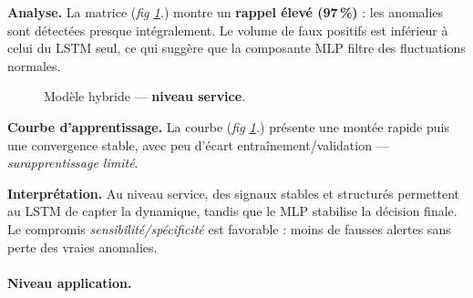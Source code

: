 \documentclass[conference]{IEEEtran}
\begin{document}
\textbf{Analyse.}
La matrice (\textit{fig \ref{fig:hybrid-service}.}) montre un \textbf{rappel élevé (97\,\%)} : les anomalies sont détectées presque intégralement.  
Le volume de faux positifs est inférieur à celui du LSTM seul, ce qui suggère que la composante MLP filtre des fluctuations normales.
\FloatBarrier
\begin{figure}[!t]
  \centering
  \hfill%
  \caption{Modèle hybride — \textbf{niveau service}.}
  \label{fig:hybrid-service}
\end{figure}

\textbf{Courbe d’apprentissage.}
La courbe (\textit{fig \ref{fig:hybrid-service}.}) présente une montée rapide puis une convergence stable, avec peu d’écart entraînement/validation — \emph{surapprentissage limité}.

\textbf{Interprétation.}
Au niveau service, des signaux stables et structurés permettent au LSTM de capter la dynamique, tandis que le MLP stabilise la décision finale. Le compromis \textit{sensibilité/spécificité} est favorable : moins de fausses alertes sans perte des vraies anomalies.

\paragraph{Niveau application.}
\end{document}
